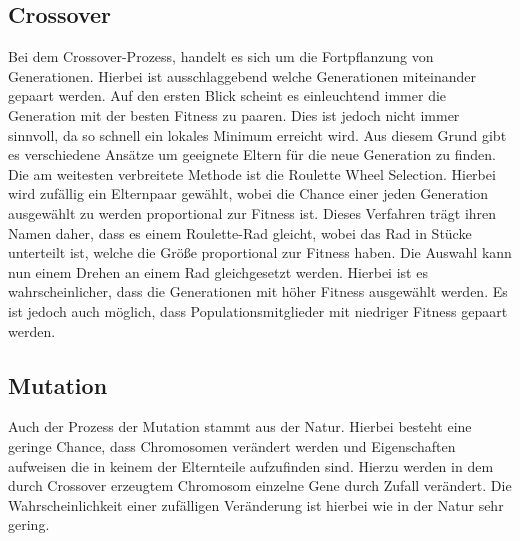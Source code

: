 \subsection{Crossover}
\label{chap:grundlagen_cossover}
Bei dem Crossover-Prozess, handelt es sich um die Fortpflanzung von Generationen. Hierbei ist ausschlaggebend welche Generationen miteinander gepaart werden. Auf den ersten Blick scheint es einleuchtend immer die Generation mit der besten Fitness zu paaren. Dies ist jedoch nicht immer sinnvoll, da so schnell ein lokales Minimum erreicht wird. Aus diesem Grund gibt es verschiedene Ansätze um geeignete Eltern für die neue Generation zu finden.\cite{davis1991handbook} Die am weitesten verbreitete Methode ist die Roulette Wheel Selection. Hierbei wird zufällig ein Elternpaar gewählt, wobei die Chance einer jeden Generation ausgewählt zu werden proportional zur Fitness ist. Dieses Verfahren trägt ihren Namen daher, dass es einem Roulette-Rad gleicht, wobei das Rad in Stücke unterteilt ist, welche die Größe proportional zur Fitness haben. Die Auswahl kann nun einem Drehen an einem Rad gleichgesetzt werden. Hierbei ist es wahrscheinlicher, dass die Generationen mit höher Fitness ausgewählt werden. Es ist jedoch auch möglich, dass Populationsmitglieder mit niedriger Fitness gepaart werden.

\subsection{Mutation}
Auch der Prozess der Mutation stammt aus der Natur. Hierbei besteht eine geringe Chance, dass Chromosomen verändert werden und Eigenschaften aufweisen die in keinem der Elternteile aufzufinden sind. Hierzu werden in dem durch Crossover erzeugtem Chromosom einzelne Gene durch Zufall verändert. Die Wahrscheinlichkeit einer zufälligen Veränderung ist hierbei wie in der Natur sehr gering.\cite{davis1991handbook}

